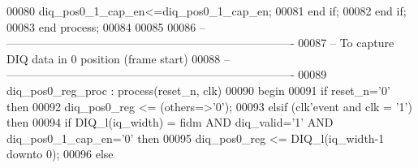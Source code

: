 \begin{DoxyCode}
00080             \textcolor{vhdlchar}{diq_pos0_1_cap_en}\textcolor{vhdlchar}{<=}\textcolor{vhdlchar}{diq_pos0_1_cap_en};
00081          \textcolor{keywordflow}{end} \textcolor{keywordflow}{if};
00082         \textcolor{keywordflow}{end} \textcolor{keywordflow}{if};
00083     \textcolor{keywordflow}{end} \textcolor{keywordflow}{process};
00084     
00085 
00086 \textcolor{keyword}{-- ----------------------------------------------------------------------------}
00087 \textcolor{keyword}{-- To capture DIQ data in 0 position (frame start)}
00088 \textcolor{keyword}{-- ----------------------------------------------------------------------------}
00089  diq\_pos0\_reg\_proc : \textcolor{keywordflow}{process}(reset_n, clk)
00090 \textcolor{vhdlkeyword}{    begin}
00091       \textcolor{keywordflow}{if} \textcolor{vhdlchar}{reset_n}\textcolor{vhdlchar}{=}\textcolor{vhdlchar}{'}\textcolor{vhdllogic}{}\textcolor{vhdllogic}{0}\textcolor{vhdlchar}{'} \textcolor{keywordflow}{then}
00092          \textcolor{vhdlchar}{diq_pos0_reg}       \textcolor{vhdlchar}{<=} \textcolor{vhdlchar}{(}\textcolor{keywordflow}{others}\textcolor{vhdlchar}{=}\textcolor{vhdlchar}{>}\textcolor{vhdlchar}{'}\textcolor{vhdllogic}{}\textcolor{vhdllogic}{0}\textcolor{vhdlchar}{'}\textcolor{vhdlchar}{)};
00093       \textcolor{keywordflow}{elsif} \textcolor{vhdlchar}{(}\textcolor{vhdlchar}{clk}\textcolor{vhdlchar}{'}\textcolor{vhdlkeyword}{event} \textcolor{keywordflow}{and} \textcolor{vhdlchar}{clk} \textcolor{vhdlchar}{=} \textcolor{vhdlchar}{'}\textcolor{vhdllogic}{}\textcolor{vhdllogic}{1}\textcolor{vhdlchar}{'}\textcolor{vhdlchar}{)} \textcolor{keywordflow}{then}
00094             \textcolor{keywordflow}{if} \textcolor{vhdlchar}{DIQ_l}\textcolor{vhdlchar}{(}\textcolor{vhdlchar}{iq_width}\textcolor{vhdlchar}{)} \textcolor{vhdlchar}{=} \textcolor{vhdlchar}{fidm} \textcolor{keywordflow}{AND} \textcolor{vhdlchar}{diq_valid}\textcolor{vhdlchar}{=}\textcolor{vhdlchar}{'}\textcolor{vhdllogic}{}\textcolor{vhdllogic}{1}\textcolor{vhdlchar}{'} \textcolor{keywordflow}{AND} \textcolor{vhdlchar}{diq_pos0_1_cap_en}\textcolor{vhdlchar}{=}\textcolor{vhdlchar}{'}\textcolor{vhdllogic}{}\textcolor{vhdllogic}{0}\textcolor{vhdlchar}{'} \textcolor{keywordflow}{then} 
00095             \textcolor{vhdlchar}{diq_pos0_reg}        \textcolor{vhdlchar}{<=} \textcolor{vhdlchar}{DIQ_l}\textcolor{vhdlchar}{(}\textcolor{vhdlchar}{iq_width}\textcolor{vhdlchar}{-}\textcolor{vhdllogic}{}\textcolor{vhdllogic}{1} \textcolor{keywordflow}{downto} \textcolor{vhdllogic}{}\textcolor{vhdllogic}{0}\textcolor{vhdlchar}{)};
00096             \textcolor{keywordflow}{else} 

\end{DoxyCode}
